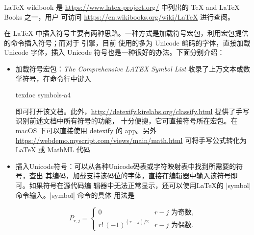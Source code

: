 








\LaTeX{} wikibook 是 \url{https://www.latex-project.org/} 中列出的 \TeX{} and \LaTeX{} Books 之一，用户
可访问 \url{https://en.wikibooks.org/wiki/LaTeX} 进行查阅。



在 \LaTeX{} 中插入符号主要有两种思路。一种方式是加载符号宏包，利用宏包提供的命令插入符号；而对于 \XeTeX{} 引擎，目前
使用的多为 Unicode 编码的字体，直接加载 Unicode 字体，插入 Unicode 符号也是一种很好的办法。下面分别介绍：
\begin{itemize}
\item
  加载符号宏包：\emph{The Comprehensive LATEX Symbol List} 收录了上万文本或数学符号，在命令行中键入
  \begin{shcode}
    texdoc symbols-a4
  \end{shcode}
  即可打开该文档。此外，\url{http://detexify.kirelabs.org/classify.html} 提供了手写识别前述文档中所有符号的功能，
  十分便捷，它可直接符号所在宏包。在 macOS 下可以直接使用 detexify 的 app。另外
  \url{https://webdemo.myscript.com/views/main/math.html} 可将手写公式转化为 \LaTeX{} 或 MathML 代码

\item 插入Unicode符号：可以从各种Unicode码表或字符映射表中找到所需要的符号，查出
  其编码，加载支持该码位的字体，直接在编辑器中输入该符号即可。如果符号在源代码编
  辑器中无法正常显示，还可以使用\LaTeX{}的 |symbol| 命令输入。|symbol| 命令的具体
  用法是
  \begin{texlist}
  \end{texlist}

  \begin{texlist}
    \[
      P_{r,j}=\left\{\begin{array}{ll} 0 & \text{$r-j$ 为奇数},\\
                       r!\,(-1)^{(r-j)/2} & \text{$r-j$ 为偶数}.
                     \end{array}\right.
                 \]
  \end{texlist}
\end{itemize}

